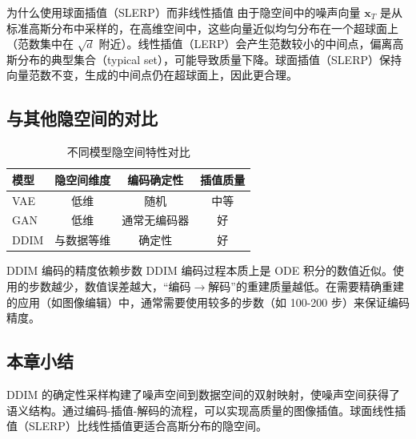 \begin{knowledgebox}{为什么使用球面插值（SLERP）而非线性插值}
由于隐空间中的噪声向量 $\mathbf{x}_T$ 是从标准高斯分布中采样的，在高维空间中，这些向量近似均匀分布在一个超球面上（范数集中在 $\sqrt{d}$ 附近）。线性插值（LERP）会产生范数较小的中间点，偏离高斯分布的典型集合（typical set），可能导致质量下降。球面插值（SLERP）保持向量范数不变，生成的中间点仍在超球面上，因此更合理。
\end{knowledgebox}

\subsection{与其他隐空间的对比}

\begin{table}[H]
\centering
\caption{不同模型隐空间特性对比}
\begin{tabular}{lccc}
\toprule
\textbf{模型} & \textbf{隐空间维度} & \textbf{编码确定性} & \textbf{插值质量} \\
\midrule
VAE & 低维 & 随机 & 中等 \\
GAN & 低维 & 通常无编码器 & 好 \\
DDIM & 与数据等维 & 确定性 & 好 \\
\bottomrule
\end{tabular}
\end{table}

\begin{warningbox}{DDIM 编码的精度依赖步数}
DDIM 编码过程本质上是 ODE 积分的数值近似。使用的步数越少，数值误差越大，``编码$\to$解码''的重建质量越低。在需要精确重建的应用（如图像编辑）中，通常需要使用较多的步数（如 100-200 步）来保证编码精度。
\end{warningbox}

\subsection{本章小结}

DDIM 的确定性采样构建了噪声空间到数据空间的双射映射，使噪声空间获得了语义结构。通过编码-插值-解码的流程，可以实现高质量的图像插值。球面线性插值（SLERP）比线性插值更适合高斯分布的隐空间。


